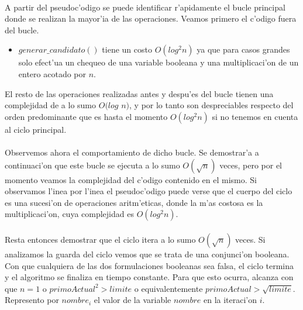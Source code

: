 \paragraph{}
A partir del pseudoc'odigo se puede identificar r'apidamente el bucle principal donde se realizan la mayor'ia
de las operaciones. Veamos primero el c'odigo fuera del bucle.
\begin{itemize}
\item $generar\_candidato()$ tiene un costo $O(log^2 n)$ ya que para casos grandes solo efect'ua un chequeo de
una variable booleana y una multiplicaci'on de un entero acotado por $n$.
\end{itemize}
El resto de las operaciones realizadas antes y despu'es del bucle tienen una complejidad de a lo sumo $O(log$ $n)$,
y por lo tanto son despreciables respecto del orden predominante que es hasta el momento $O(log^2 n)$ si no tenemos
en cuenta al ciclo principal.

\paragraph{}
Observemos ahora el comportamiento de dicho bucle. Se demostrar'a a continuaci'on que este bucle se ejecuta a lo sumo
$O(\sqrt{n})$ veces, pero por el momento veamos la complejidad del c'odigo contenido en el mismo. Si observamos
l'inea por l'inea el pseudoc'odigo puede verse que el cuerpo del ciclo es una sucesi'on de operaciones aritm'eticas,
donde la m'as costosa es la multiplicaci'on, cuya complejidad es $O(log^2 n)$.

\paragraph{}
Resta entonces demostrar que el ciclo itera a lo sumo $O(\sqrt{n})$ veces. Si analizamos la guarda del ciclo vemos
que se trata de una conjunci'on booleana. Con que cualquiera de las dos formulaciones booleanas sea falsa, el ciclo
termina y el algoritmo se finaliza en tiempo constante. Para que esto ocurra, alcanza con que $n = 1$ o $primoActual^2
> limite$ o equivalentemente $primoActual > \sqrt{limite}$. Represento por $nombre_i$ el valor de la variable $nombre$ 
en la iteraci'on $i$. 

